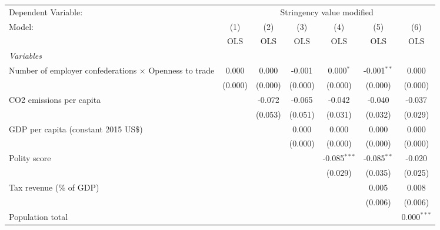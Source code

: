 
\begingroup
\centering
\begin{tabular}{lcccccc}
   \toprule
   Dependent Variable: & \multicolumn{6}{c}{Stringency value modified}\\
   Model:                                                        & (1)     & (2)     & (3)     & (4)            & (5)           & (6)\\  
                                                                 &  OLS    & OLS     & OLS     & OLS            & OLS           & OLS\\  
   \midrule
   \emph{Variables}\\
   Number of employer confederations $\times$ Openness to trade  & 0.000   & 0.000   & -0.001  & 0.000$^{*}$    & -0.001$^{**}$ & 0.000\\   
                                                                 & (0.000) & (0.000) & (0.000) & (0.000)        & (0.000)       & (0.000)\\   
   CO2 emissions per capita                                      &         & -0.072  & -0.065  & -0.042         & -0.040        & -0.037\\   
                                                                 &         & (0.053) & (0.051) & (0.031)        & (0.032)       & (0.029)\\   
   GDP per capita (constant 2015 US\$)                           &         &         & 0.000   & 0.000          & 0.000         & 0.000\\   
                                                                 &         &         & (0.000) & (0.000)        & (0.000)       & (0.000)\\   
   Polity score                                                  &         &         &         & -0.085$^{***}$ & -0.085$^{**}$ & -0.020\\   
                                                                 &         &         &         & (0.029)        & (0.035)       & (0.025)\\   
   Tax revenue (\% of GDP)                                       &         &         &         &                & 0.005         & 0.008\\   
                                                                 &         &         &         &                & (0.006)       & (0.006)\\   
   Population total                                              &         &         &         &                &               & 0.000$^{***}$\\   

\end{tabular}
